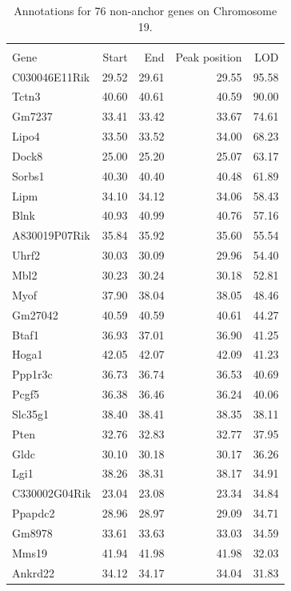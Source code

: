 \documentclass[oneside]{book}\usepackage[]{graphicx}\usepackage[]{color}
\begin{document}
{\small
\begin{longtable}{lrrrr}
\caption{Annotations for 76 non-anchor genes on Chromosome 19.}\label{tab:ann76}\\
\hline \\
Gene & Start & End & Peak position & LOD \\
  \hline
C030046E11Rik & 29.52 & 29.61 & 29.55 & 95.58 \\
  Tctn3 & 40.60 & 40.61 & 40.59 & 90.00 \\
  Gm7237 & 33.41 & 33.42 & 33.67 & 74.61 \\
  Lipo4 & 33.50 & 33.52 & 34.00 & 68.23 \\
  Dock8 & 25.00 & 25.20 & 25.07 & 63.17 \\
  Sorbs1 & 40.30 & 40.40 & 40.48 & 61.89 \\
  Lipm & 34.10 & 34.12 & 34.06 & 58.43 \\
  Blnk & 40.93 & 40.99 & 40.76 & 57.16 \\
  A830019P07Rik & 35.84 & 35.92 & 35.60 & 55.54 \\
  Uhrf2 & 30.03 & 30.09 & 29.96 & 54.40 \\
  Mbl2 & 30.23 & 30.24 & 30.18 & 52.81 \\
  Myof & 37.90 & 38.04 & 38.05 & 48.46 \\
  Gm27042 & 40.59 & 40.59 & 40.61 & 44.27 \\
  Btaf1 & 36.93 & 37.01 & 36.90 & 41.25 \\
  Hoga1 & 42.05 & 42.07 & 42.09 & 41.23 \\
  Ppp1r3c & 36.73 & 36.74 & 36.53 & 40.69 \\
  Pcgf5 & 36.38 & 36.46 & 36.24 & 40.06 \\
  Slc35g1 & 38.40 & 38.41 & 38.35 & 38.11 \\
  Pten & 32.76 & 32.83 & 32.77 & 37.95 \\
  Gldc & 30.10 & 30.18 & 30.17 & 36.26 \\
  Lgi1 & 38.26 & 38.31 & 38.17 & 34.91 \\
  C330002G04Rik & 23.04 & 23.08 & 23.34 & 34.84 \\
  Ppapdc2 & 28.96 & 28.97 & 29.09 & 34.71 \\
  Gm8978 & 33.61 & 33.63 & 33.03 & 34.59 \\
  Mms19 & 41.94 & 41.98 & 41.98 & 32.03 \\
  Ankrd22 & 34.12 & 34.17 & 34.04 & 31.83 \\

\end{longtable}}
\end{document}
